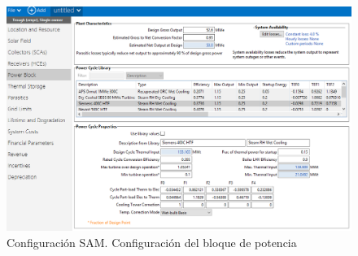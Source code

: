 \begin{figure}
\includegraphics[scale=0.8]{images/captura_sam04.png}
\caption{Configuración SAM. Configuración del bloque de potencia} 
\label{fig:captura04}
\end{figure}

